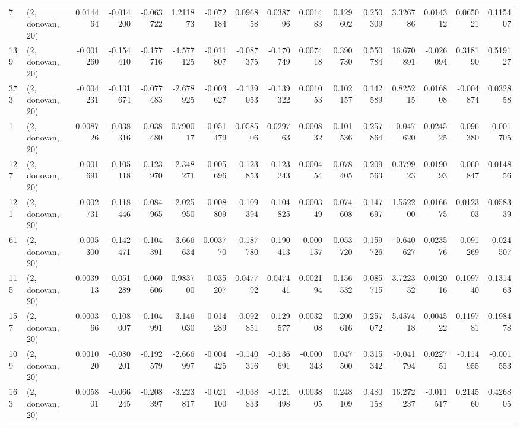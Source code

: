 \begin{tabular}{llrrrrrrrrrrrrrr}
7   &  (2, donovan, 20) &   0.014464 & -0.014200 & -0.063722 &    1.211873 & -0.072184 &   0.096858 &  0.038796 &  0.001483 &  0.129602 &  0.250309 &     3.326786 &  0.014312 &  0.065021 &  0.115407 \\
139 &  (2, donovan, 20) &  -0.001260 & -0.154410 & -0.177716 &   -4.577125 & -0.011807 &  -0.087375 & -0.170749 &  0.007418 &  0.390730 &  0.550784 &    16.670891 & -0.026094 &  0.318190 &  0.519127 \\
373 &  (2, donovan, 20) &  -0.004231 & -0.131674 & -0.077483 &   -2.678925 & -0.003627 &  -0.139053 & -0.139322 &  0.001053 &  0.102157 &  0.142589 &     0.825215 &  0.016808 & -0.004874 &  0.032858 \\
1   &  (2, donovan, 20) &   0.008726 & -0.038316 & -0.038480 &    0.790017 & -0.051479 &   0.058506 &  0.029763 &  0.000832 &  0.101536 &  0.257864 &    -0.047620 &  0.024525 & -0.096380 & -0.001705 \\
127 &  (2, donovan, 20) &  -0.001691 & -0.105118 & -0.123970 &   -2.348271 & -0.005696 &  -0.123853 & -0.123243 &  0.000454 &  0.078405 &  0.209563 &     0.379923 &  0.019093 & -0.060847 &  0.014856 \\
121 &  (2, donovan, 20) &  -0.002731 & -0.118446 & -0.084965 &   -2.025950 & -0.008809 &  -0.109394 & -0.104825 &  0.000349 &  0.074608 &  0.147697 &     1.552200 &  0.016675 &  0.012303 &  0.058339 \\
61  &  (2, donovan, 20) &  -0.005300 & -0.142471 & -0.104391 &   -3.666634 &  0.003770 &  -0.187780 & -0.190413 & -0.000157 &  0.053720 &  0.159726 &    -0.640627 &  0.023576 & -0.091269 & -0.024507 \\
115 &  (2, donovan, 20) &   0.003913 & -0.051289 & -0.060606 &    0.983700 & -0.035207 &   0.047792 &  0.047441 &  0.002194 &  0.156532 &  0.085715 &     3.722352 &  0.012016 &  0.109740 &  0.131463 \\
157 &  (2, donovan, 20) &   0.000366 & -0.108007 & -0.104991 &   -3.146030 & -0.014289 &  -0.092851 & -0.129577 &  0.003208 &  0.200616 &  0.257072 &     5.457418 &  0.004522 &  0.119781 &  0.198478 \\
109 &  (2, donovan, 20) &   0.001020 & -0.080201 & -0.192579 &   -2.666997 & -0.004425 &  -0.140316 & -0.136691 & -0.000343 &  0.047500 &  0.315342 &    -0.041794 &  0.022751 & -0.114955 & -0.001553 \\
163 &  (2, donovan, 20) &   0.005801 & -0.066245 & -0.208397 &   -3.223817 & -0.021100 &  -0.038833 & -0.121498 &  0.003805 &  0.248109 &  0.480158 &    16.272237 & -0.011517 &  0.214560 &  0.426805 \\

\end{tabular}
